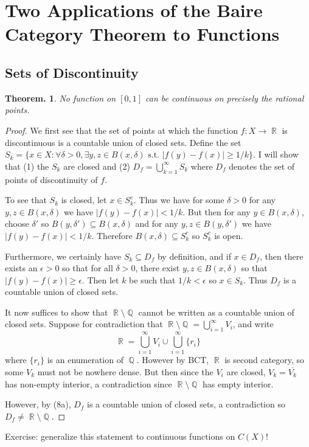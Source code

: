 \documentclass[11pt, a4paper]{memoir}
\DeclareMathOperator{\Q}{{\mathbb{Q}}}
\DeclareMathOperator{\R}{{\mathbb{R}}}
\theoremstyle{change}
\newtheorem{theorem}{Theorem.}[section]
\theoremstyle{plain}
\theoremstyle{nonumberplain}
\newtheorem{proof}{Proof}
\numberwithin{equation}{section}
\begin{document}
\section{Two Applications of the Baire Category Theorem to Functions}
\subsection{Sets of Discontinuity}
\begin{theorem}
    No function on $[0,1]$ can be continuous on precisely the rational points.
\end{theorem}
\begin{proof}
    We first see that the set of points at which the function $f:X\to\R$ is discontinuous is a countable union of closed sets.
    Define the set $S_k=\{x\in X:\forall\delta>0,\exists y,z\in B(x,\delta)\text{ s.t. }|f(y)-f(x)|\geq 1/k\}$.
    I will show that (1) the $S_k$ are closed and (2) $D_f=\bigcup_{k=1}^\infty S_k$ where $D_f$ denotes the set of points of discontinuity of $f$.

    To see that $S_k$ is closed, let $x\in S_k^c$.
    Thus we have for some $\delta>0$ for any  $y,z\in B(x,\delta)$ we have $|f(y)-f(x)|<1/k$.
    But then for any $y\in B(x,\delta)$, choose $\delta'$ so $B(y,\delta')\subseteq B(x,\delta)$ and for any $y,z\in B(y,\delta')$ we have $|f(y)-f(x)|<1/k$.
    Therefore $B(x,\delta)\subseteq S_k^c$ so $S_k^c$ is open.

    Furthermore, we certainly have $S_k\subseteq D_f$ by definition, and if $x\in D_f$, then there exists an $\epsilon>0$ so that for all $\delta>0$, there exist $y,z\in B(x,\delta)$ so that $|f(y)-f(x)|\geq\epsilon$.
    Then let $k$ be such that $1/k<\epsilon$ so $x\in S_k$.
    Thus $D_f$ is a countable union of closed sets.

    It now suffices to show that $\R\setminus\Q$ cannot be written as a countable union of closed sets.
    Suppose for contradiction that $\R\setminus\Q=\bigcup\limits_{i=1}^\infty V_i$, and write
    \[\R=\bigcup\limits_{i=1}^\infty V_i\cup\bigcup\limits_{i=1}^\infty\{r_i\}\]
    where $\{r_i\}$ is an enumeration of $\Q$.
    However by BCT, $\R$ is second category, so some $V_k$ must not be nowhere dense.
    But then since the $V_i$ are closed, $V_k=\overline{V_k}$ has non-empty interior, a contradiction since $\R\setminus\Q$ has empty interior.

    However, by (8a), $D_f$ is a countable union of closed sets, a contradiction so $D_f\neq\R\setminus\Q$.
\end{proof}
Exercise: generalize this statement to continuous functions on $C(X)$!
\end{document}
